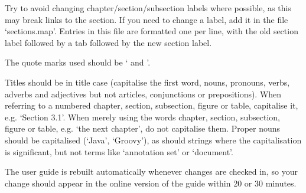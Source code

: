 Try to avoid changing chapter/section/subsection labels where possible, as this
may break links to the section. If you need to change a label, add it in the
file `sections.map'. Entries in this file are formatted one per line, with the
old section label followed by a tab followed by the new section label.

The quote marks used should be ` and '.

Titles should be in title case (capitalise the first word, nouns, pronouns,
verbs, adverbs and adjectives but not articles, conjunctions or prepositions).
When referring to a numbered chapter, section, subsection, figure or table,
capitalise it, e.g. `Section 3.1'. When merely using the words chapter, section,
subsection, figure or table, e.g. `the next chapter', do not capitalise them.
Proper nouns should be capitalised (`Java', `Groovy'), as should strings where
the capitalisation is significant, but not terms like `annotation set' or
`document'.

The user guide is rebuilt automatically whenever changes are checked in, so
your change should appear in the online version of the guide within 20 or 30
minutes.
